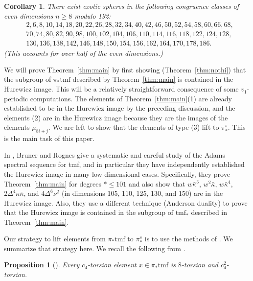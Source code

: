 \documentclass[10pt]{amsart}
\newcommand{\tmf}{\mathrm{tmf}}
\newtheorem{cor}[equation]{Corollary}
\newtheorem{prop}[equation]{Proposition}
\theoremstyle{definition}
\numberwithin{equation}{section}
\numberwithin{figure}{section}
\begin{document}
\begin{cor}\label{cor:exotic}
There exist exotic spheres in the following congruence classes of even dimensions $n \ge 8$ modulo 192:
\begin{align*}
& 2, 6, 8, 10, 14, 18, 20, 22, 26, 28, 32, 34, 40, 42, 46, 50, 52, 54, 58, 60, 66, 68, \\ 
& 70, 74, 80, 82, 
 90, 98, 100, 102, 104, 106, 110, 114, 116, 118, 122, 124, 128, \\
 & 130, 136, 138, 142, 146, 148,
150, 154, 156, 162, 164, 170, 178, 186.
\end{align*}
(This accounts for over half of the even dimensions.)
\end{cor}

We will prove Theorem~\ref{thm:main} by first showing (Theorem~\ref{thm:nothi}) that the subgroup of $\pi_*\tmf$ described by Theorem~\ref{thm:main} is contained in the Hurewicz image.  This will be a relatively straightforward consequence of some $v_1$-periodic computations.  The elements of Theorem~\ref{thm:main}(1) are already established to be in the Hurewicz image by the preceding discussion, and the elements (2) are in the Hurewicz image because they are the images of the elements $\mu_{8i+j}$. 
We are left to show that the elements of type (3) lift to $\pi_*^s$.  This is the main task of this paper.

In \cite{BrunerRognes}, Bruner and Rognes give a systematic and careful study of the Adams spectral sequence for tmf, and in particular they have independently established the Hurewicz image in many low-dimensional cases.  Specifically, they prove Theorem~\ref{thm:main} for degrees $* \le 101$ and also show that $w\bar{\kappa}^3$, $w^2\bar{\kappa}$, $w\bar{\kappa}^4$, $2\Delta^4\kappa\bar{\kappa}$, and $4\Delta^6 \nu^2$ (in dimensions 105, 110, 125, 130, and 150) are in the Hurewicz image.  Also, they use a different technique (Anderson duality) to prove that the Hurewicz image is contained in the subgroup of $\tmf_*$ described in Theorem~\ref{thm:main}. 

Our strategy to lift elements from $\pi_*\tmf$ to $\pi_*^s$ is to use the methods of \cite{BHHM2}.  We summarize that strategy here.
We recall the following from \cite[Prop. 6.1]{BHHM2}.

\begin{prop}[\cite{BHHM2}]\label{prop:torsion}
Every $c_4$-torsion element $x \in \pi_{*}\tmf$ is $8$-torsion and $c_4^2$-torsion.
\end{prop}
\end{document}

